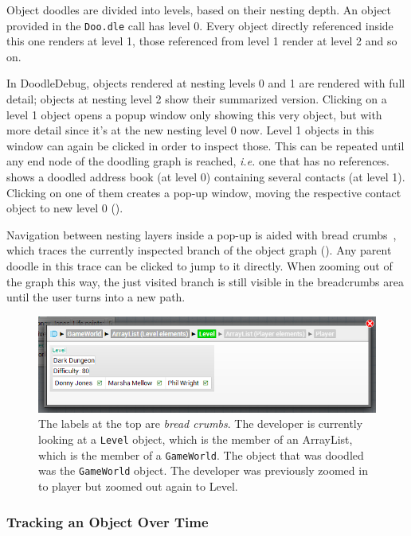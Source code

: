 \documentclass[english]{scrartcl}
\newcommand{\ie}{\emph{i.e.}\xspace}
\newcommand{\DD}{Dood\-le\-De\-bug\xspace}
\newcommand{\Doodle}{\texttt{Doo.\-dle}\xspace}
\begin{document}
Object doodles are divided into levels, based on their nesting depth.
An object provided in the \Doodle call has level 0.
Every object directly referenced inside this one renders at level 1, those referenced from level 1 render at level 2 and so on.

In \DD, objects rendered at nesting levels 0 and 1 are rendered with full detail; objects at nesting level 2 show their summarized version.
Clicking on a level 1 object opens a popup window only showing this very object, but with more detail since it's at the new nesting level 0 now.
Level 1 objects in this window can again be clicked in order to inspect those.
This can be repeated until any end node of the doodling graph is reached, \ie one that has no references.
 shows a doodled address book (at level 0) containing several contacts (at level 1). Clicking on one of them creates a pop-up window, moving the respective contact object to new level 0 ().

Navigation between nesting layers inside a pop-up is aided with bread crumbs~\cite[p. 76-78]{Krug00a}, which traces the currently inspected branch of the object graph ().
Any parent doodle in this trace can be clicked to jump to it directly.
When zooming out of the graph this way, the just visited branch is still visible in the breadcrumbs area until the user turns into a new path.

\begin{figure}[h]
	\includegraphics[width=\linewidth]{img/breadcrumbs.png}
	\caption{The labels at the top are \emph{bread crumbs}. The developer is currently looking at a \texttt{Level} object, which is the member of an ArrayList, which is the member of a \texttt{GameWorld}. The object that was doodled was the \texttt{GameWorld} object. The developer was previously zoomed in to player but zoomed out again to Level.}
\end{figure}

\subsubsection{Tracking an Object Over Time}
\end{document}
